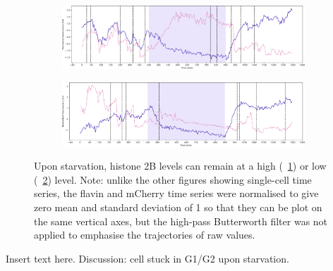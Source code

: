 \begin{figure}
  \centering
  \begin{subfigure}[htpb]{1.0\textwidth}
   \centering
   \includegraphics[width=\textwidth]{starvation_raw_13-07-02.pdf}
   \caption{
   }
   \label{fig:biology-starvation-raw-1}
  \end{subfigure}

  \begin{subfigure}[htpb]{1.0\textwidth}
   \centering
   \includegraphics[width=\textwidth]{starvation_raw_13-39-01.pdf}
   \caption{
   }
   \label{fig:biology-starvation-raw-2}
  \end{subfigure}

  \caption{
    Upon starvation, histone 2B levels can remain at a high (~\ref{fig:biology-starvation-raw-1}) or low (~\ref{fig:biology-starvation-raw-2}) level.
    Note: unlike the other figures showing single-cell time series, the flavin and mCherry time series were normalised to give zero mean and standard deviation of 1 so that they can be plot on the same vertical axes, but the high-pass Butterworth filter was not applied to emphasise the trajectories of raw values.
  }
  \label{fig:biology-starvation-raw}
\end{figure}

Insert text here.  Discussion: cell stuck in G1/G2 upon starvation.


